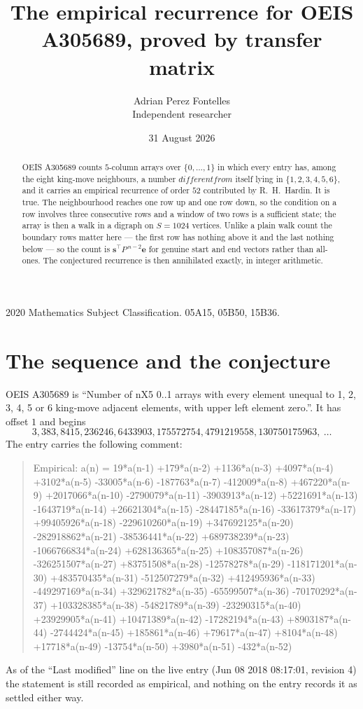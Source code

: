 \documentclass[11pt,a4paper]{article}
\title{The empirical recurrence for OEIS A305689, proved by transfer matrix}
\author{Adrian Perez Fontelles\\ \small Independent researcher}
\date{31 August 2026}
\theoremstyle{plain}
\theoremstyle{definition}
\begin{document}
\maketitle

\begin{abstract}
OEIS A305689 counts $5$-column arrays over $\{0,\dots,1\}$ in which every entry has,
among the eight king-move neighbours, a number $different from$ itself lying in $\{1,2,3,4,5,6\}$, and it carries an empirical
recurrence of order $52$ contributed by R.~H.~Hardin. It is true. The neighbourhood
reaches one row up and one row down, so the condition on a row involves three consecutive
rows and a window of two rows is a sufficient state; the array is then a walk in a digraph
on $S=1024$ vertices. Unlike a plain walk count the boundary rows matter here --- the first
row has nothing above it and the last nothing below --- so the count is
$\mathbf{s}^{\!\top}P^{\,n-2}\mathbf{e}$ for genuine start and end vectors rather than
all-ones. The conjectured recurrence is then annihilated exactly, in integer arithmetic.
\end{abstract}

\noindent\small 2020 Mathematics Subject Classification. 05A15, 05B50, 15B36.\normalsize

\section{The sequence and the conjecture}

OEIS A305689 is ``Number of nX5 0..1 arrays with every element unequal to 1, 2, 3, 4, 5 or 6 king-move adjacent elements, with upper left element zero.''. It has offset
$1$ and begins
\[
3, 383, 8415, 236246, 6433903, 175572754, 4791219558, 130750175963,\ \dots
\]
The entry carries the following comment:
\begin{quote}\small
Empirical: a(n) = 19*a(n-1) +179*a(n-2) +1136*a(n-3) +4097*a(n-4) +3102*a(n-5) -33005*a(n-6) -187763*a(n-7) -412009*a(n-8) +467220*a(n-9) +2017066*a(n-10) -2790079*a(n-11) -3903913*a(n-12) +5221691*a(n-13) -1643719*a(n-14) +26621304*a(n-15) -28447185*a(n-16) -33617379*a(n-17) +99405926*a(n-18) -229610260*a(n-19) +347692125*a(n-20) -282918862*a(n-21) -38536441*a(n-22) +689738239*a(n-23) -1066766834*a(n-24) +628136365*a(n-25) +108357087*a(n-26) -326251507*a(n-27) +83751508*a(n-28) -12578278*a(n-29) -118171201*a(n-30) +483570435*a(n-31) -512507279*a(n-32) +412495936*a(n-33) -449297169*a(n-34) +329621782*a(n-35) -65599507*a(n-36) -70170292*a(n-37) +103328385*a(n-38) -54821789*a(n-39) -23290315*a(n-40) +23929905*a(n-41) +10471389*a(n-42) -17282194*a(n-43) +8903187*a(n-44) -2744424*a(n-45) +185861*a(n-46) +79617*a(n-47) +8104*a(n-48) +17718*a(n-49) -13754*a(n-50) +3980*a(n-51) -432*a(n-52)
\end{quote}
As of the ``Last modified'' line on the live entry (Jun 08 2018 08:17:01, revision
4) the statement is still recorded as empirical, and nothing on the entry
records it as settled either way.
\end{document}
